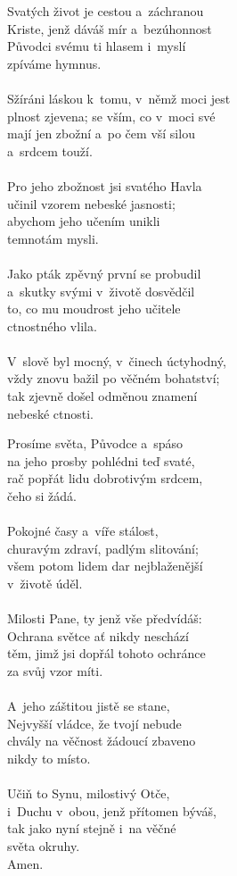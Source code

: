 \begin{translatioMulticol}{2}
Svatých život je cestou a~záchranou\\
Kriste, jenž dáváš mír a~bezúhonnost\\
Původci svému ti hlasem i~myslí\\
zpíváme hymnus.\\
\\
Sžíráni láskou k~tomu, v~němž moci jest\\
plnost zjevena; se vším, co v~moci své\\
mají jen zbožní a~po čem vší silou\\
a~srdcem touží.\\
\\
Pro jeho zbožnost jsi svatého Havla\\
učinil vzorem nebeské jasnosti;\\
abychom jeho učením unikli\\
temnotám mysli. \\
\\
Jako pták zpěvný první se probudil\\
a~skutky svými v~životě dosvědčil\\
to, co mu moudrost jeho učitele\\
ctnostného vlila.\\
\\
V~slově byl mocný, v~činech úctyhodný,\\
vždy znovu bažil po věčném bohatství;\\
tak zjevně došel odměnou znamení\\
nebeské ctnosti.\columnbreak

Prosíme světa, Původce a~spáso\\
na jeho prosby pohlédni teď svaté,\\
rač popřát lidu dobrotivým srdcem,\\
čeho si žádá.\\
\\
Pokojné časy a~víře stálost,\\
churavým zdraví, padlým slitování;\\
všem potom lidem dar nejblaženější\\
v~životě úděl.\\
\\
Milosti Pane, ty jenž vše předvídáš:\\
Ochrana světce ať nikdy neschází\\
těm, jimž jsi dopřál tohoto ochránce\\
za svůj vzor míti.\\
\\
A~jeho záštitou jistě se stane,\\
Nejvyšší vládce, že tvojí nebude\\
chvály na věčnost žádoucí zbaveno\\
nikdy to místo.\\
\\
Učiň to Synu, milostivý Otče,\\
i~Duchu v~obou, jenž přítomen býváš,\\
tak jako nyní stejně i~na věčné\\
světa okruhy.\\
Amen.
\end{translatioMulticol}
